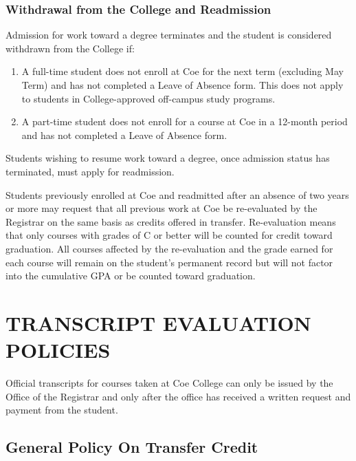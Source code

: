 \documentclass[
  letterpaper,
]{scrbook}
\providecommand{\tightlist}{%
  \setlength{\itemsep}{0pt}\setlength{\parskip}{0pt}}
\begin{document}
\subsection{Withdrawal from the College and
Readmission}\label{withdrawal-from-the-college-and-readmission}

Admission for work toward a degree terminates and the student is
considered withdrawn from the College if:

\begin{enumerate}
\def\labelenumi{\arabic{enumi}.}
\tightlist
\item
  A full-time student does not enroll at Coe for the next term
  (excluding May Term) and has not completed a Leave of Absence form.
  This does not apply to students in College-approved off-campus study
  programs.
\item
  A part-time student does not enroll for a course at Coe in a 12-month
  period and has not completed a Leave of Absence form.
\end{enumerate}

Students wishing to resume work toward a degree, once admission status
has terminated, must apply for readmission.

Students previously enrolled at Coe and readmitted after an absence of
two years or more may request that all previous work at Coe be
re-evaluated by the Registrar on the same basis as credits offered in
transfer. Re-evaluation means that only courses with grades of C or
better will be counted for credit toward graduation. All courses
affected by the re-evaluation and the grade earned for each course will
remain on the student's permanent record but will not factor into the
cumulative GPA or be counted toward graduation.

\chapter{TRANSCRIPT EVALUATION
POLICIES}\label{transcript-evaluation-policies}

Official transcripts for courses taken at Coe College can only be issued
by the Office of the Registrar and only after the office has received a
written request and payment from the student.

\section{General Policy On Transfer
Credit}\label{general-policy-on-transfer-credit}
\end{document}
